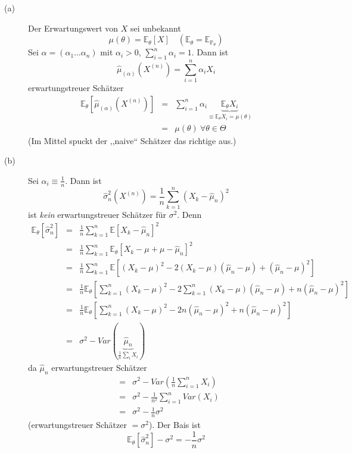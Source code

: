 \documentclass[10pt,a4paper]{report}
\numberwithin{equation}{section}
\numberwithin{figure}{section}
\theoremstyle{plain}
\theoremstyle{definition}
\theoremstyle{remark}
\theoremstyle{plain}
\newcommand{\1}{ \mathbb{1} } %
\begin{document}
\begin{description}
\item [{(a)}] Der Erwartungswert von $X$ sei unbekannt
\[
\mu\left(\theta\right)=\mathbb{E}_{\theta}\left[X\right]\quad\left(\mathbb{E}_{\theta}=\mathbb{E}_{\mathbb{P}_{\theta}}\right)
\]
Sei $\alpha=\left(\alpha_{1}\ldots\alpha_{n}\right)$ mit $\alpha_{i}>0$,
$\sum_{i=1}^{n}\alpha_{i}=1$. Dann ist
\[
\hat{\mu}_{\left(\alpha\right)}\left(X^{\left(n\right)}\right)=\sum_{i=1}^{n}\alpha_{i}X_{i}
\]
erwartungstreuer Schätzer
\begin{eqnarray*}
\mathbb{E}_{\theta}\left[\hat{\mu}_{\left(\alpha\right)}\left(X^{\left(n\right)}\right)\right] & = & \sum_{i=1}^{n}\alpha_{i}\underset{\equiv\mathbb{E}_{\theta}X_{i}=\mu\left(\theta\right)}{\underbrace{\mathbb{E}_{\theta}X_{i}}}\\
 & = & \mu\left(\theta\right)\ \forall\theta\in\Theta
\end{eqnarray*}
(Im Mittel spuckt der ,,naive`` Schätzer das richtige aus.)
\item [{(b)}] Sei $\alpha_{i}\equiv\frac{1}{n}$. Dann ist
\[
\hat{\sigma}_{n}^{2}\left(X^{\left(n\right)}\right)=\frac{1}{n}\sum_{k=1}^{n}\left(X_{k}-\hat{\mu}_{n}\right)^{2}
\]
ist \emph{kein} erwartungstreuer Schätzer für $\sigma^{2}$. Denn
\begin{eqnarray*}
\mathbb{E}_{\theta}\left[\hat{\sigma}_{n}^{2}\right] & = & \frac{1}{n}\sum_{k=1}^{n}\mathbb{E}\left[X_{k}-\hat{\mu}_{n}\right]^{2}\\
 & = & \frac{1}{n}\sum_{k=1}^{n}\mathbb{E}_{\theta}\left[X_{k}-\mu+\mu-\hat{\mu}_{n}\right]^{2}\\
 & = & \frac{1}{n}\sum_{k=1}^{n}\mathbb{E}\left[\left(X_{k}-\mu\right)^{2}-2\left(X_{k}-\mu\right)\left(\hat{\mu}_{n}-\mu\right)+\left(\hat{\mu}_{n}-\mu\right)^{2}\right]\\
 & = & \frac{1}{n}\mathbb{E}_{\theta}\left[\sum_{k=1}^{n}\left(X_{k}-\mu\right)^{2}-2\sum_{k=1}^{n}\left(X_{k}-\mu\right)\left(\hat{\mu}_{n}-\mu\right)+n\left(\hat{\mu}_{n}-\mu\right)^{2}\right]\\
 & = & \frac{1}{n}\mathbb{E}_{\theta}\left[\sum_{k=1}^{n}\left(X_{k}-\mu\right)^{2}-2n\left(\hat{\mu}_{n}-\mu\right)^{2}+n\left(\hat{\mu}_{n}-\mu\right)^{2}\right]\\
 & = & \sigma^{2}-Var(\underset{\frac{1}{n}\sum_{i}X_{i}}{\underbrace{\hat{\mu}_{n}}})
\end{eqnarray*}
da $\hat{\mu}_{n}$ erwartungstreuer Schätzer
\begin{eqnarray*}
 & = & \sigma^{2}-Var\left(\frac{1}{n}\sum_{i=1}^{n}X_{i}\right)\\
 & = & \sigma^{2}-\frac{1}{n^{2}}\sum_{i=1}^{n}Var\left(X_{i}\right)\\
 & = & \sigma^{2}-\frac{1}{n}\sigma^{2}
\end{eqnarray*}
(erwartungstreuer Schätzer $=\sigma^{2}$). Der Bais ist 
\[
\mathbb{E}_{\theta}\left[\hat{\sigma}_{n}^{2}\right]-\sigma^{2}=-\frac{1}{n}\sigma^{2}
\]
\end{description}
\end{document}
